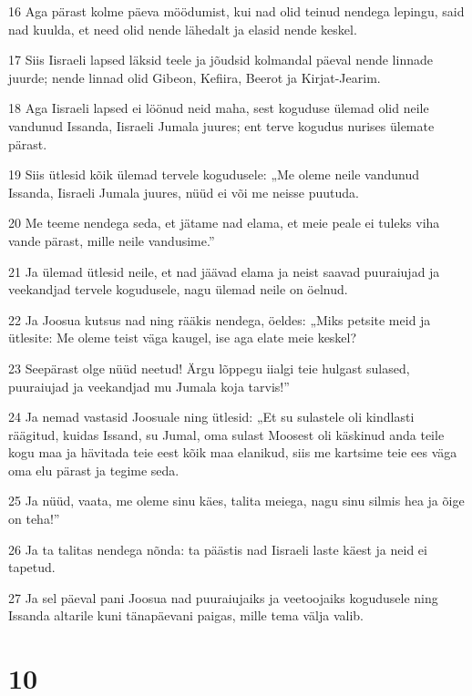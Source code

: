 \par 16 Aga pärast kolme päeva möödumist, kui nad olid teinud nendega lepingu, said nad kuulda, et need olid nende lähedalt ja elasid nende keskel.
\par 17 Siis Iisraeli lapsed läksid teele ja jõudsid kolmandal päeval nende linnade juurde; nende linnad olid Gibeon, Kefiira, Beerot ja Kirjat-Jearim.
\par 18 Aga Iisraeli lapsed ei löönud neid maha, sest koguduse ülemad olid neile vandunud Issanda, Iisraeli Jumala juures; ent terve kogudus nurises ülemate pärast.
\par 19 Siis ütlesid kõik ülemad tervele kogudusele: „Me oleme neile vandunud Issanda, Iisraeli Jumala juures, nüüd ei või me neisse puutuda.
\par 20 Me teeme nendega seda, et jätame nad elama, et meie peale ei tuleks viha vande pärast, mille neile vandusime.”
\par 21 Ja ülemad ütlesid neile, et nad jäävad elama ja neist saavad puuraiujad ja veekandjad tervele kogudusele, nagu ülemad neile on öelnud.
\par 22 Ja Joosua kutsus nad ning rääkis nendega, öeldes: „Miks petsite meid ja ütlesite: Me oleme teist väga kaugel, ise aga elate meie keskel?
\par 23 Seepärast olge nüüd neetud! Ärgu lõppegu iialgi teie hulgast sulased, puuraiujad ja veekandjad mu Jumala koja tarvis!”
\par 24 Ja nemad vastasid Joosuale ning ütlesid: „Et su sulastele oli kindlasti räägitud, kuidas Issand, su Jumal, oma sulast Moosest oli käskinud anda teile kogu maa ja hävitada teie eest kõik maa elanikud, siis me kartsime teie ees väga oma elu pärast ja tegime seda.
\par 25 Ja nüüd, vaata, me oleme sinu käes, talita meiega, nagu sinu silmis hea ja õige on teha!”
\par 26 Ja ta talitas nendega nõnda: ta päästis nad Iisraeli laste käest ja neid ei tapetud.
\par 27 Ja sel päeval pani Joosua nad puuraiujaiks ja veetoojaiks kogudusele ning Issanda altarile kuni tänapäevani paigas, mille tema välja valib.

\chapter{10}

